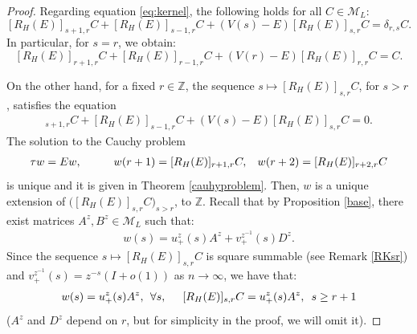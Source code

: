 \documentclass[12pt,oneside,onecolumn,open]{article}
\begin{document}
\begin{proof}
   Regarding equation \eqref{eq:kernel}, the following holds for all $C\in \mathcal{M}_L$:
\begin{equation}
     \label{eq:kernel2}
     [R_{H}(E)]_{ s+1,r}C + [R_{H}(E)]_{ s-1,r}C + (V(s) - E)[R_{H}(E)]_{s,r}C = \delta_{r,s}  C.
\end{equation}
In particular, for \(s = r\), we obtain:
\begin{equation}\label{deq}
     [R_{H}(E)]_{r+1,r}C + [R_{H}(E)]_{r-1,r}C + (V(r) - E)[R_{H}(E)]_{r,r}C = C.
\end{equation}

On the other hand, for a fixed \(r \in \mathbb{Z}\), the sequence \( s \mapsto [R_{H}(E)]_{s,r}C\), for $s>r$, satisfies the equation
\begin{align}
[R_{H}(E)]_{ s+1,r}C + [R_{H}(E)]_{ s-1,r}C + (V(s) - E)[R_{H}(E)]_{s,r}C=0 . 
\end{align}
The solution to the Cauchy problem 
\begin{align}
    \tau w = E w ,   \hspace{1cm}  w(r+1) = [R_{H}(E)]_{r+1,r}C,   \hspace{.3cm}
     w(r+2) = [R_{H}(E)]_{r+2,r}C
     \end{align}
is unique and it is given in Theorem \ref{cauhyproblem}. Then, $w$ is a unique extension of 
   \( \Big (  [R_{H}(E)]_{s,r}C \Big )_ {s>r}\),  to $ \mathbb{Z} $. 
 Recall that by Proposition \ref{base}, there exist matrices \(A^{z}, B^{z} \in \mathcal{M}_{L}\) such that:
\begin{align}
    w(s) = u_{+}^{z}(s) A^{z} + v_{+}^{z^{-1}}(s) D^{z}.
\end{align}
Since the sequence \( s \mapsto [R_{H}(E)]_{s,r}C\) is square summable (see Remark \ref{RKsr})  and \(v_{+}^{z^{-1}}(s) = z^{-s}(I + o(1))\) as \(n \to \infty\), we have that:
 \begin{align}\label{nj}
  w(s) =u_{+}^{z}(s) A^{z}, \:  \: \forall s,  \hspace{.5cm}   [R_{H}(E)]_{s,r}C =u_{+}^{z}(s) A^{z},\,\,\, s\geq r+1  
 \end{align}
($A^z$ and $D^z$ depend on $r$, but for simplicity in the proof, we will omit it).


\end{proof}
\end{document}
